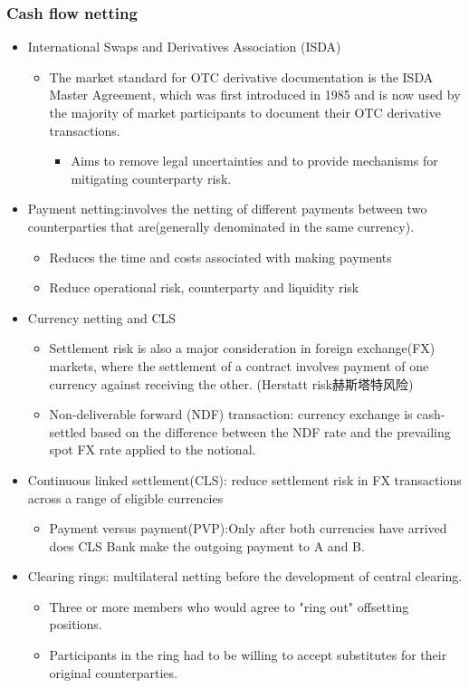 \subsubsection{Cash flow netting}
\begin{itemize}
    \item International Swaps and Derivatives Association (ISDA)
    \begin{itemize}
    \item The market standard for OTC derivative documentation is the ISDA Master Agreement, which was first introduced in 1985 and is now used by the majority of market participants to document their OTC derivative transactions.
    \begin{itemize}
    \item Aims to remove legal uncertainties and to provide mechanisms for mitigating counterparty risk.
    \end{itemize}
    \end{itemize}
\item Payment netting:involves the netting of different payments between two counterparties that are(generally denominated in the same currency).
\begin{itemize}
    \item Reduces the time and costs associated with making payments
    \item Reduce operational risk, counterparty and liquidity risk
\end{itemize}
\item Currency netting and CLS
\begin{itemize}
\item Settlement risk is also a major consideration in foreign
exchange(FX) markets, where the settlement of a contract
involves payment of one currency against receiving the other.
(Herstatt risk赫斯塔特风险)
\item Non-deliverable forward (NDF) transaction: currency exchange is cash-settled based on the difference between the NDF rate and the prevailing spot FX rate applied to the notional.
\end{itemize}
\item Continuous linked settlement(CLS): reduce settlement risk in FX transactions across a range of eligible currencies
\begin{itemize}
    \item Payment versus payment(PVP):Only after both currencies have arrived does CLS Bank make the outgoing payment to A and B.
\end{itemize}
\item Clearing rings: multilateral netting before the development of central clearing.
\begin{itemize}
    \item Three or more members who would agree to "ring out" offsetting positions.
    \item Participants in the ring had to be willing to accept substitutes for their original counterparties.
\end{itemize}


\end{itemize}
